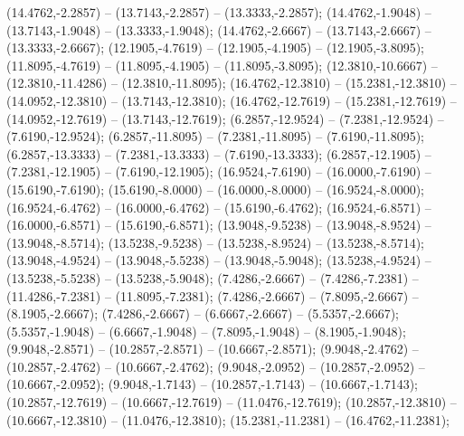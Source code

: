    (14.4762,-2.2857) -- (13.7143,-2.2857) -- (13.3333,-2.2857);
   (14.4762,-1.9048) -- (13.7143,-1.9048) -- (13.3333,-1.9048);
   (14.4762,-2.6667) -- (13.7143,-2.6667) -- (13.3333,-2.6667);
   (12.1905,-4.7619) -- (12.1905,-4.1905) -- (12.1905,-3.8095);
   (11.8095,-4.7619) -- (11.8095,-4.1905) -- (11.8095,-3.8095);
   (12.3810,-10.6667) -- (12.3810,-11.4286) -- (12.3810,-11.8095);
   (16.4762,-12.3810) -- (15.2381,-12.3810) -- (14.0952,-12.3810) -- (13.7143,-12.3810);
   (16.4762,-12.7619) -- (15.2381,-12.7619) -- (14.0952,-12.7619) -- (13.7143,-12.7619);
   (6.2857,-12.9524) -- (7.2381,-12.9524) -- (7.6190,-12.9524);
   (6.2857,-11.8095) -- (7.2381,-11.8095) -- (7.6190,-11.8095);
   (6.2857,-13.3333) -- (7.2381,-13.3333) -- (7.6190,-13.3333);
   (6.2857,-12.1905) -- (7.2381,-12.1905) -- (7.6190,-12.1905);
   (16.9524,-7.6190) -- (16.0000,-7.6190) -- (15.6190,-7.6190);
   (15.6190,-8.0000) -- (16.0000,-8.0000) -- (16.9524,-8.0000);
   (16.9524,-6.4762) -- (16.0000,-6.4762) -- (15.6190,-6.4762);
   (16.9524,-6.8571) -- (16.0000,-6.8571) -- (15.6190,-6.8571);
   (13.9048,-9.5238) -- (13.9048,-8.9524) -- (13.9048,-8.5714);
   (13.5238,-9.5238) -- (13.5238,-8.9524) -- (13.5238,-8.5714);
   (13.9048,-4.9524) -- (13.9048,-5.5238) -- (13.9048,-5.9048);
   (13.5238,-4.9524) -- (13.5238,-5.5238) -- (13.5238,-5.9048);
   (7.4286,-2.6667) -- (7.4286,-7.2381) -- (11.4286,-7.2381) -- (11.8095,-7.2381);
   (7.4286,-2.6667) -- (7.8095,-2.6667) -- (8.1905,-2.6667);
   (7.4286,-2.6667) -- (6.6667,-2.6667) -- (5.5357,-2.6667);
   (5.5357,-1.9048) -- (6.6667,-1.9048) -- (7.8095,-1.9048) -- (8.1905,-1.9048);
   (9.9048,-2.8571) -- (10.2857,-2.8571) -- (10.6667,-2.8571);
   (9.9048,-2.4762) -- (10.2857,-2.4762) -- (10.6667,-2.4762);
   (9.9048,-2.0952) -- (10.2857,-2.0952) -- (10.6667,-2.0952);
   (9.9048,-1.7143) -- (10.2857,-1.7143) -- (10.6667,-1.7143);
   (10.2857,-12.7619) -- (10.6667,-12.7619) -- (11.0476,-12.7619);
   (10.2857,-12.3810) -- (10.6667,-12.3810) -- (11.0476,-12.3810);
   (15.2381,-11.2381) -- (16.4762,-11.2381);
